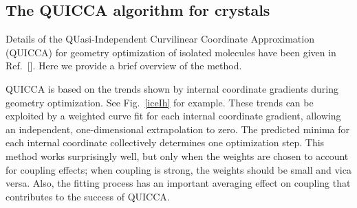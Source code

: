 \twolinestyle{\documentclass[prb,preprint]{revtex4}}
\begin{document}

\subsection{The QUICCA algorithm for crystals} 

Details of the QUasi-Independent Curvilinear Coordinate Approximation 
(QUICCA) for geometry optimization of isolated molecules have been 
given in Ref.~[].  Here we provide a brief overview 
of the method.  

QUICCA is based on the trends shown by internal coordinate 
gradients during geometry optimization.  See Fig.~\ref{iceIh} for example.
These trends can be exploited by a weighted curve fit for each internal 
coordinate gradient,  allowing an independent, one-dimensional extrapolation 
to zero. The predicted minima for each internal coordinate  collectively 
determines one optimization step.  This method works surprisingly well, but 
only when the weights are chosen to account for coupling effects;  when 
coupling is strong, the weights should be small and vica versa.  Also, the
fitting process has an important averaging effect on coupling that contributes 
to the success of QUICCA.
\end{document}
